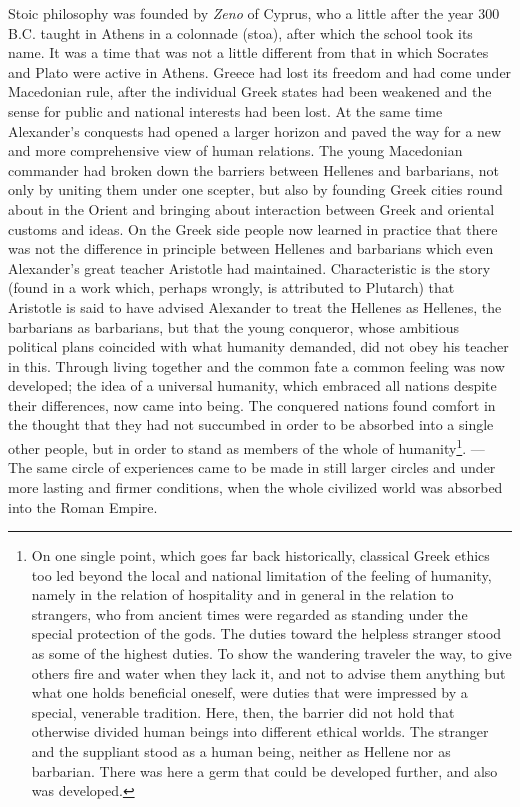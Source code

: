 \documentclass[12pt,a4paper,openany]{book}
\newcommand{\opage}[1]{\marginnote{\footnotesize\textit{[#1]}}}
\begin{document}
Stoic philosophy was founded by \emph{Zeno} of Cyprus,
who a little after the year 300 B.C. taught in Athens in a colonnade
(stoa), after which the school took its name. It was a time that
was not a little different from that in which Socrates and Plato
were active in Athens. Greece had lost its freedom and
had come under Macedonian rule, after the
individual Greek states had been weakened and the sense for
public and national interests had been lost. At the same time
Alexander's conquests had opened a larger horizon and
paved the way for a new and more comprehensive view of
human relations. The young Macedonian commander had
broken down the barriers between Hellenes and barbarians, not only
by uniting them under one scepter, but also by
founding Greek cities round about in the Orient and bringing about
interaction between Greek and oriental customs and
ideas. On the Greek side people now learned in practice that
there was not the difference in principle between Hellenes and
barbarians which even Alexander's great teacher Aristotle had
maintained. Characteristic is the story (found in a
\opage{168}work which, perhaps wrongly, is attributed to Plutarch) that
Aristotle is said to have advised Alexander to treat the Hellenes
as Hellenes, the barbarians as barbarians, but that the young
conqueror, whose ambitious political plans coincided with
what humanity demanded, did not obey his teacher in this. Through
living together and the common fate a common
feeling was now developed; the idea of a universal humanity, which
embraced all nations despite their differences, now
came into being. The conquered nations found comfort in the thought that they
had not succumbed in order to be absorbed into a single other
people, but in order to stand as members of the whole of humanity\footnote{On one single point, which goes far back historically,
classical Greek ethics too led beyond the local and national
limitation of the feeling of humanity, namely in
the relation of hospitality and in general in the relation to strangers, who from
ancient times were regarded as standing under the special protection of the gods.
The duties toward the helpless stranger stood as some of the
highest duties. To show the wandering traveler the way, to give others
fire and water when they lack it, and not to advise them anything but
what one holds beneficial oneself, were duties that were impressed by
a special, venerable tradition. Here, then, the barrier did not hold
that otherwise divided human beings into different ethical worlds. The
stranger and the suppliant stood as a human being, neither as
Hellene nor as barbarian. There was here a germ that could be developed further,
and also was developed.}.
--- The same circle of experiences came to be
made in still larger circles and under more lasting and firmer
conditions, when the whole civilized world was absorbed into the Roman Empire.
\end{document}
